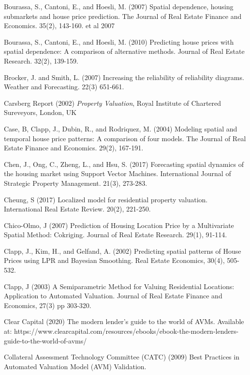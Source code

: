 \documentclass[colTwo]{format}
\theoremstyle{definition}
\begin{document}
\begin{thebibliography}{50}
\harvarditem{}{}{}Bourassa, S., Cantoni, E., and Hoesli, M. (2007) Spatial dependence, housing submarkets and house price prediction. The Journal of Real Estate Finance and Economics. 35(2), 143-160.  et al 2007

\harvarditem{}{}{}Bourassa, S., Cantoni, E., and Hoesli, M. (2010) Predicting house prices with spatial dependence: A comparison of alternative methods. Journal of Real Estate Research. 32(2), 139-159. 

\harvarditem{}{}{}Brocker, J. and Smith, L. (2007) Increasing the reliability of reliability diagrams. Weather and Forecasting. 22(3) 651-661. 

\harvarditem{}{}{}Carsberg Report (2002) \textit{Property Valuation}, Royal Institute of Chartered Sureveyors, London, UK

\harvarditem{}{}{}Case, B, Clapp, J., Dubin, R., and Rodriquez, M. (2004) Modeling spatial and temporal house price patterns: A comparison of four models. The Journal of Real Estate Finance and Economics. 29(2), 167-191. 

\harvarditem{}{}{}Chen, J., Ong, C., Zheng, L., and Hsu, S. (2017) Forecasting spatial dynamics of the housing market using Support Vector Machines. International Journal of Strategic Property Management. 21(3), 273-283. 

\harvarditem{}{}{}Cheung, S (2017) Localized model for residential property valuation. International Real Estate Review. 20(2), 221-250. 

\harvarditem{}{}{}Chico-Olmo, J (2007) Prediction of Housing Location Price by a Multivariate Spatial Method: Cokriging. Journal of Real Estate Research. 29(1), 91-114. 

\harvarditem{}{}{}Clapp, J., Kim, H., and Gelfand, A. (2002) Predicting spatial patterns of House Prices using LPR and Bayesian Smoothing. Real Estate Economics, 30(4), 505-532. 

\harvarditem{}{}{}Clapp, J (2003) A Semiparametric Method for Valuing Residential Locations: Application to Automated Valuation. Journal of Real Estate Finance and Economics, 27(3) pp 303-320. 

\harvarditem{}{}{}Clear Capital (2020) The modern lender’s guide to the world of AVMs. Available at: https://www.clearcapital.com/resources/ebooks/ebook-the-modern-lenders-guide-to-the-world-of-avms/

\harvarditem{}{}{}Collateral Assessment Technology Committee (CATC) (2009) Best Practices in Automated Valuation Model (AVM) Validation. 


\end{thebibliography}
\end{document}
